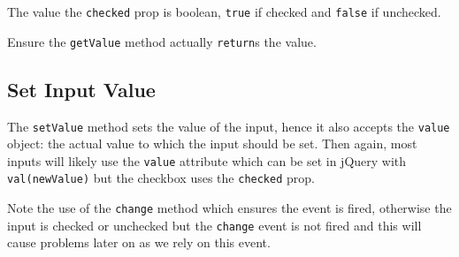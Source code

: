 \documentclass[
]{krantz}
\makeatletter
\newenvironment{Shaded}{\begin{snugshade}}{\end{snugshade}}
\newcommand{\AttributeTok}[1]{\textcolor[rgb]{0.61,0.61,0.61}{#1}}
\newcommand{\CommentTok}[1]{\textcolor[rgb]{0.37,0.37,0.37}{\textit{#1}}}
\newcommand{\ControlFlowTok}[1]{\textcolor[rgb]{0.27,0.27,0.27}{\textbf{#1}}}
\newcommand{\DataTypeTok}[1]{\textcolor[rgb]{0.27,0.27,0.27}{#1}}
\newcommand{\KeywordTok}[1]{\textcolor[rgb]{0.27,0.27,0.27}{\textbf{#1}}}
\newcommand{\NormalTok}[1]{#1}
\newcommand{\OperatorTok}[1]{\textcolor[rgb]{0.43,0.43,0.43}{\textbf{#1}}}
\newcommand{\StringTok}[1]{\textcolor[rgb]{0.5,0.5,0.5}{#1}}
\newcommand{\VariableTok}[1]{\textcolor[rgb]{0,0,0}{#1}}
\newenvironment{kframe}{%
\medskip{}
\setlength{\fboxsep}{.8em}
 \def\at@end@of@kframe{}%
 \ifinner\ifhmode%
  \def\at@end@of@kframe{\end{minipage}}%
  \begin{minipage}{\columnwidth}%
 \fi\fi%
 \def\FrameCommand##1{\hskip\@totalleftmargin \hskip-\fboxsep
 \colorbox{shadecolor}{##1}\hskip-\fboxsep
     \hskip-\linewidth \hskip-\@totalleftmargin \hskip\columnwidth}%
 \MakeFramed {\advance\hsize-\width
   \@totalleftmargin\z@ \linewidth\hsize
   \@setminipage}}%
 {\par\unskip\endMakeFramed%
 \at@end@of@kframe}
\renewenvironment{Shaded}{\begin{kframe}}{\end{kframe}}
\newenvironment{rmdblock}[1]
  {
  \begin{itemize}
  \renewcommand{\labelitemi}{
    \raisebox{-.7\height}[0pt][0pt]{
      {\setkeys{Gin}{width=3em,keepaspectratio}\texttt{[image: images/\#1]}}
    }
  }
  \setlength{\fboxsep}{1em}
  \begin{kframe}
  \item
  }
  {
  \end{kframe}
  \end{itemize}
  }
\newenvironment{rmdnote}
  {\begin{rmdblock}{note}}
  {\end{rmdblock}}
\makeatother
\begin{document}
The value the \texttt{checked} prop is boolean, \texttt{true} if checked and \texttt{false} if unchecked.

\begin{rmdnote}
Ensure the \texttt{getValue} method actually \texttt{return}s the value.
\end{rmdnote}

\hypertarget{shiny-input-set-value}{%
\subsection{Set Input Value}\label{shiny-input-set-value}}

The \texttt{setValue} method sets the value of the input, hence it also accepts the \texttt{value} object: the actual value to which the input should be set. Then again, most inputs will likely use the \texttt{value} attribute which can be set in jQuery with \texttt{val(newValue)} but the checkbox uses the \texttt{checked} prop.

\begin{Shaded}
\end{Shaded}

Note the use of the \texttt{change} method which ensures the event is fired, otherwise the input is checked or unchecked but the \texttt{change} event is not fired and this will cause problems later on as we rely on this event.
\end{document}
